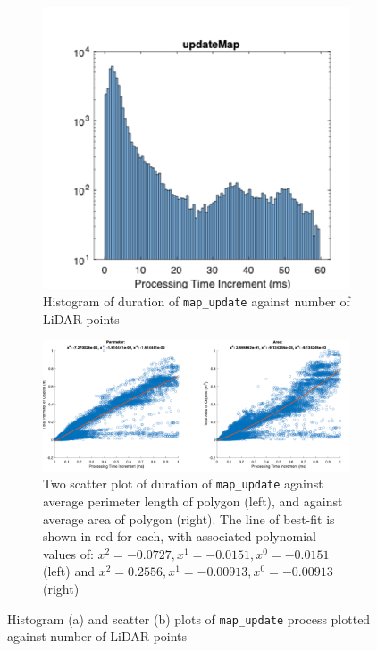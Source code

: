 \documentclass[../main.tex]{subfiles}
\begin{document}
\begin{figure}[htbp]
    \centering
    \begin{subfigure}[b]{0.44\linewidth}
        \centering
        \includegraphics[width=\linewidth]{Images/gbcache/Update_Map_hist.png}
        \caption{Histogram of duration of \texttt{map\_update} against number of LiDAR points}
        \label{fig:gbcache_update_map_hist}
    \end{subfigure}
    \vspace{1em} %
    \begin{subfigure}[b]{0.8\linewidth}
        \centering
        \includegraphics[width=\linewidth]{Images/gbcache/Update_Map_scatter.png}
        \caption{Two scatter plot of duration of \texttt{map\_update} against average perimeter length of polygon (left), and against average area of polygon (right). The line of best-fit is shown in red for each, with associated polynomial values of: $x^2 = -0.0727, x^1 = -0.0151, x^0 = -0.0151$ (left) and $x^2 = 0.2556, x^1 = -0.00913, x^0 = -0.00913$ (right) }
        \label{fig:gbcache_update_map_scatter}
    \end{subfigure}

    \caption{Histogram (a) and scatter (b) plots of \texttt{map\_update} process plotted against number of LiDAR points}
    \label{fig:gbcache_update_map}
\end{figure}
\end{document}
